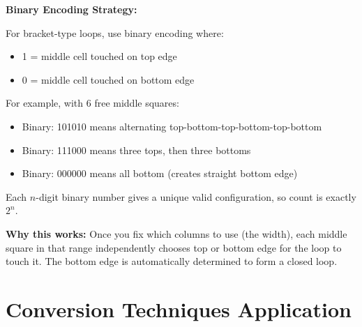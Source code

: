 \documentclass[12pt]{article}
\begin{document}
\begin{protip}
\textbf{Binary Encoding Strategy:}

For bracket-type loops, use binary encoding where:
\begin{itemize}
    \item 1 = middle cell touched on top edge
    \item 0 = middle cell touched on bottom edge
\end{itemize}

For example, with 6 free middle squares:
\begin{itemize}
    \item Binary: 101010 means alternating top-bottom-top-bottom-top-bottom
    \item Binary: 111000 means three tops, then three bottoms
    \item Binary: 000000 means all bottom (creates straight bottom edge)
\end{itemize}

Each $n$-digit binary number gives a unique valid configuration, so count is exactly $2^n$.

\textbf{Why this works:} Once you fix which columns to use (the width), each middle square in that range independently chooses top or bottom edge for the loop to touch it. The bottom edge is automatically determined to form a closed loop.
\end{protip}

\section{Conversion Techniques Application}
\end{document}
